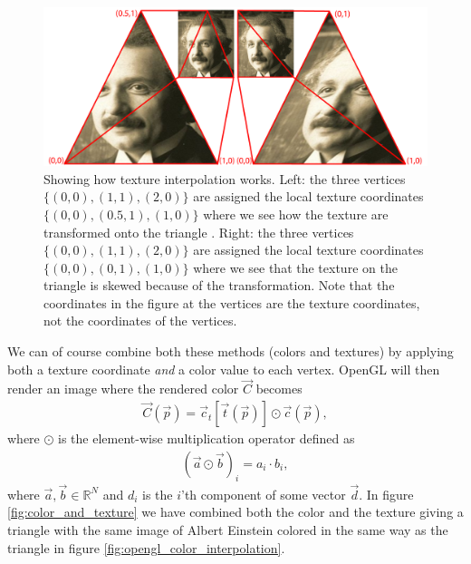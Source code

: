 \begin{figure}[h]
\begin{center}
\includegraphics[width=\textwidth, trim=0cm 0cm 0cm 0cm, clip]{opengl/figures/texture_interpolation.png}
\end{center}
\caption{Showing how texture interpolation works. Left: the three vertices $\{(0,0), (1,1), (2,0)\}$ are assigned the local texture coordinates $\{(0,0), (0.5,1), (1,0)\}$ where we see how the texture are transformed onto the triangle . Right: the three vertices $\{(0,0), (1,1), (2,0)\}$ are assigned the local texture coordinates $\{(0,0), (0,1), (1,0)\}$ where we see that the texture on the triangle is skewed because of the transformation. Note that the coordinates in the figure at the vertices are the texture coordinates, not the coordinates of the vertices.}
\label{fig:opengl_texture_interpolation}
\end{figure}
We can of course combine both these methods (colors and textures) by applying both a texture coordinate \textit{and} a color value to each vertex. OpenGL will then render an image where the rendered color $\vec C$ becomes
\begin{align}
	\label{eq:opengl_combining_colors_textures}
	\vec C(\vec p) = \vec c_t[\vec t(\vec p)] \odot \vec c(\vec p),
\end{align}
where $\odot$ is the element-wise multiplication operator defined as
\begin{align}
	(\vec a \odot \vec b)_i = a_i\cdot b_i,
\end{align}
where $\vec a,\vec b \in \mathbb{R}^N$ and $d_i$ is the $i$'th component of some vector $\vec d$. In figure \ref{fig:color_and_texture} we have combined both the color and the texture giving a triangle with the same image of Albert Einstein colored in the same way as the triangle in figure \ref{fig:opengl_color_interpolation}.
